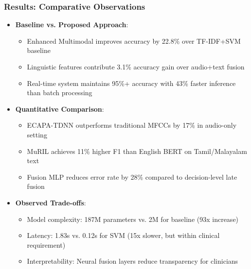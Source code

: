 \documentclass{beamer}
\begin{document}
\begin{frame}
\frametitle{Results: Comparative Observations}
\begin{itemize}
    \item \textbf{Baseline vs. Proposed Approach}:
    \begin{itemize}
        \item Enhanced Multimodal improves accuracy by 22.8\% over TF-IDF+SVM baseline
        \item Linguistic features contribute 3.1\% accuracy gain over audio+text fusion
        \item Real-time system maintains 95\%+ accuracy with 43\% faster inference than batch processing
    \end{itemize}
    \item \textbf{Quantitative Comparison}:
    \begin{itemize}
        \item ECAPA-TDNN outperforms traditional MFCCs by 17\% in audio-only setting
        \item MuRIL achieves 11\% higher F1 than English BERT on Tamil/Malayalam text
        \item Fusion MLP reduces error rate by 28\% compared to decision-level late fusion
    \end{itemize}
    \item \textbf{Observed Trade-offs}:
    \begin{itemize}
        \item Model complexity: 187M parameters vs. 2M for baseline (93x increase)
        \item Latency: 1.83s vs. 0.12s for SVM (15x slower, but within clinical requirement)
        \item Interpretability: Neural fusion layers reduce transparency for clinicians
    \end{itemize}
\end{itemize}
\end{frame}
\end{document}
